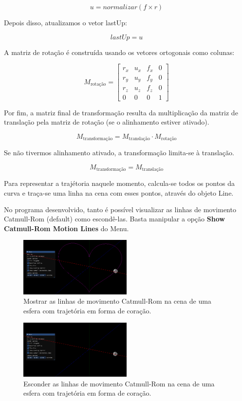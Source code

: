 \documentclass[12pt, a4paper]{article}
\begin{document}
$$
u = normalizar(f \times r)
$$

Depois disso, atualizamos o vetor lastUp:

$$
lastUp = u
$$

A matriz de rotação é construída usando os vetores ortogonais como colunas:

$$
M_{\text{rotação}} =
\begin{bmatrix}
    r_x & u_x   & f_x & 0 \\
    r_y  & u_y & f_y & 0 \\
    r_z & u_z  & f_z  & 0 \\
    0  & 0 & 0    & 1
\end{bmatrix}
$$

Por fim, a matriz
final de transformação resulta da multiplicação da matriz de translação pela matriz de
rotação (se o alinhamento estiver ativado).

$$
M_{\text{transformação}} = M_{\text{translação}} \cdot M_{\text{rotação}}
$$

Se não tivermos alinhamento ativado, a transformação limita-se à translação.

$$
M_{\text{transformação}} = M_{\text{translação}}
$$

Para representar a trajétoria naquele momento, calcula-se todos os pontos da curva e
traça-se uma linha na cena com esses pontos, através do objeto Line.

No programa desenvolvido, tanto é possível visualizar as linhas de movimento Catmull-Rom (default)
como escondê-las. Basta manipular a opção \textbf{Show Catmull-Rom Motion Lines} do Menu.

\begin{figure}[H]
    \centering
    \includegraphics[width=0.5\textwidth]{res/phase3/ShowCatmullRomMotionLines.png}
    \caption{Mostrar as linhas de movimento Catmull-Rom na cena de
    uma esfera com trajetória em forma de coração.}
\end{figure}

\begin{figure}[H]
    \centering
    \includegraphics[width=0.5\textwidth]{res/phase3/HideCatmullRomMotionLines.png}
    \caption{Esconder as linhas de movimento Catmull-Rom na cena de
    uma esfera com trajetória em forma de coração.}
\end{figure}
\end{document}
